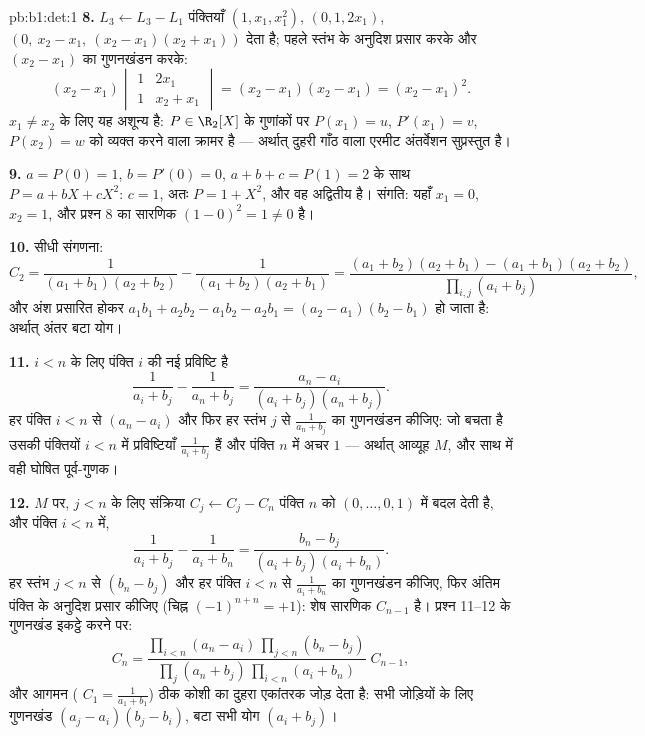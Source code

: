 \begin{solution}{pb:b1:det:1}
\textbf{8.} $L_3 \leftarrow L_3 - L_1$ पंक्तियाँ $(1, x_1, x_1^2)$, $(0, 1,
2x_1)$, $(0,\ x_2 - x_1,\ (x_2-x_1)(x_2+x_1))$ देता है; पहले स्तंभ के अनुदिश
प्रसार करके और $(x_2 - x_1)$ का गुणनखंडन करके:
\[
(x_2 - x_1)\begin{vmatrix} 1 & 2x_1\\ 1 & x_2 + x_1
\end{vmatrix} = (x_2 - x_1)(x_2 - x_1) = (x_2 - x_1)^2 .
\]
$x_1 \neq x_2$ के लिए यह अशून्य है: $P \in \R_2[X]$ के गुणांकों पर $P(x_1) =
u$, $P'(x_1) = v$, $P(x_2) = w$ को व्यक्त करने वाला  क्रामर है
--- अर्थात् दुहरी गाँठ वाला एरमीट अंतर्वेशन सुप्रस्तुत है।

\textbf{9.} $a = P(0) = 1$, $b = P'(0) = 0$, $a + b + c = P(1) = 2$ के साथ
$P = a + bX + cX^2$: $c = 1$, अतः $P = 1 + X^2$, और वह अद्वितीय है। संगति:
यहाँ $x_1 = 0$, $x_2 = 1$, और प्रश्न 8 का सारणिक $(1 - 0)^2 = 1 \neq 0$ है।

\textbf{10.} सीधी संगणना:
\[
C_2 = \frac{1}{(a_1+b_1)(a_2+b_2)} - \frac{1}{(a_1+b_2)(a_2+b_1)}
= \frac{(a_1+b_2)(a_2+b_1) - (a_1+b_1)(a_2+b_2)}
{\prod_{i,j}(a_i+b_j)} ,
\]
और अंश प्रसारित होकर $a_1b_1 + a_2b_2 - a_1b_2 - a_2b_1 = (a_2 - a_1)(b_2 -
b_1)$ हो जाता है: अर्थात् अंतर बटा योग।

\textbf{11.} $i < n$ के लिए पंक्ति $i$ की नई प्रविष्टि है
\[
\frac{1}{a_i + b_j} - \frac{1}{a_n + b_j}
= \frac{a_n - a_i}{(a_i + b_j)(a_n + b_j)} .
\]
हर पंक्ति $i < n$ से $(a_n - a_i)$ और फिर हर स्तंभ $j$ से $\frac1{a_n +
b_j}$ का गुणनखंडन कीजिए: जो बचता है उसकी पंक्तियों $i < n$ में प्रविष्टियाँ
$\frac1{a_i + b_j}$ हैं और पंक्ति $n$ में अचर $1$ --- अर्थात् आव्यूह $M$, और
साथ में वही घोषित पूर्व-गुणक।

\textbf{12.} $M$ पर, $j < n$ के लिए संक्रिया $C_j \leftarrow C_j - C_n$
पंक्ति $n$ को $(0, \dots, 0, 1)$ में बदल देती है, और पंक्ति $i < n$ में,
\[
\frac{1}{a_i + b_j} - \frac{1}{a_i + b_n}
= \frac{b_n - b_j}{(a_i + b_j)(a_i + b_n)} .
\]
हर स्तंभ $j < n$ से $(b_n - b_j)$ और हर पंक्ति $i < n$ से $\frac1{a_i +
b_n}$ का गुणनखंडन कीजिए, फिर अंतिम पंक्ति के अनुदिश प्रसार कीजिए (चिह्न
$(-1)^{n+n} = +1$): शेष सारणिक $C_{n-1}$ है। प्रश्न 11--12 के गुणनखंड इकट्ठे
करने पर:
\[
C_n = \frac{\prod_{i<n}(a_n - a_i)\,\prod_{j<n}(b_n - b_j)}
{\prod_{j}(a_n + b_j)\,\prod_{i<n}(a_i + b_n)}\;C_{n-1},
\]
और आगमन ( $C_1 = \frac1{a_1+b_1}$) ठीक कोशी का दुहरा एकांतरक जोड़ देता
है: सभी जोड़ियों के लिए गुणनखंड $(a_j - a_i)(b_j - b_i)$, बटा सभी योग $(a_i
+ b_j)$।


\end{solution}
